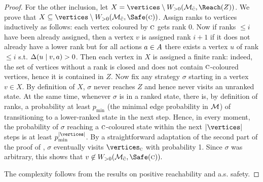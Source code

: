 \begin{proof}
For the other inclusion, let $ X = \vertices \setminus \winPos(\mdp_{\bar{\genColour}},\Reach(Z)) $. We prove that $ X\subseteq \vertices \setminus \winPos(\mdp_{\bar{\genColour}},\Safe(\genColour)) $. Assign ranks to vertices inductively as follows: each vertex coloured by $ \textsc{c} $ gets rank $ 0 $. Now if ranks $ \leq i $ have been already assigned, then a vertex  $ v $ is assigned rank $i+1  $ if it  does  not already have a lower rank but for all actions $ a\in A $ there exists a vertex $ u $ of rank $ \leq i $ s.t. $ \Delta(u \mid v,a) >0$. Then each vertex in $ X $ is assigned a finite rank: indeed, the set of vertices without a rank is closed and does not contain $ \textsc{c} $-coloured vertices, hence it is contained in $ Z $. 
Now fix any strategy $ \sigma $ starting in a vertex $v \in X $. By definition of $ X $, $ \sigma $ never reaches $ Z $ and hence never visits an unranked state. At the same time, whenever $ \sigma $ is in a ranked state, there is, by definition of ranks, a probability at least $p_{\min}  $ (the minimal edge probability in $ \mathcal{M} $) of transitioning to a lower-ranked state in the next step. Hence, in every moment, the probability of $ \sigma $ reaching a $ \textsc{c} $-coloured state within the next $ |\vertices| $ steps is at least $ p_{\min}^{|\vertices|} $. By a straightforward adaptation of the second part of the proof of , $ \sigma $ eventually visits $ \vertices_{\genColour} $ with probability 1. Since $ \sigma $ was arbitrary, this shows that $ v\not \in\winPos(\mdp_{\bar{\genColour}},\Safe(\genColour)).  $

The complexity follows from the results on positive reachability and a.s. safety.
\end{proof}

%
